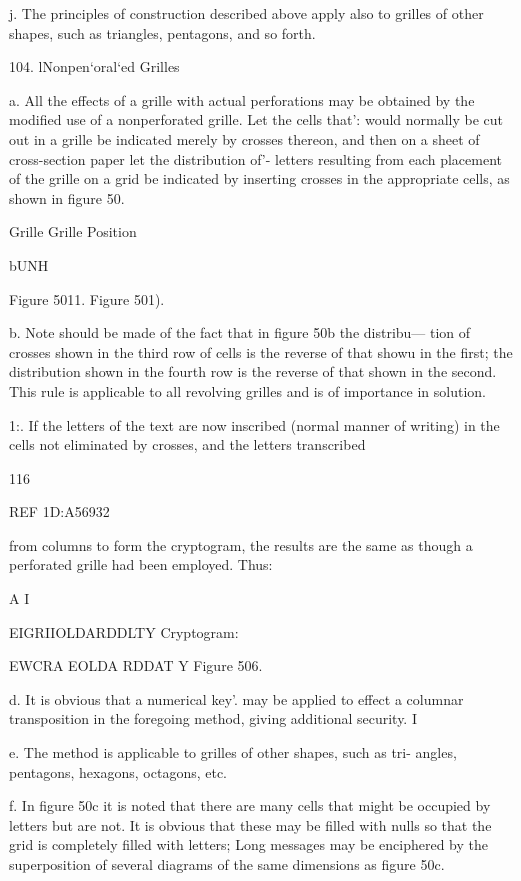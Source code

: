 j. The principles of construction described above apply also to grilles
of other shapes, such as triangles, pentagons, and so forth.

104. lNonpen‘oral‘ed Grilles

a. All the effects of a grille with actual perforations may be obtained
by the modiﬁed use of a nonperforated grille. Let the cells that': would
normally be cut out in a grille be indicated merely by crosses thereon,
and then on a sheet of cross-section paper let the distribution of'- letters
resulting from each placement of the grille on a grid be indicated by
inserting crosses in the appropriate cells, as shown in ﬁgure 50.

Grille Grille Position

   

bUNH

Figure 5011. Figure 501).

b. Note should be made of the fact that in ﬁgure 50b the distribu—
tion of crosses shown in the third row of cells is the reverse of that
showu in the ﬁrst; the distribution shown in the fourth row is the reverse
of that shown in the second. This rule is applicable to all revolving
grilles and is of importance in solution.

1:. If the letters of the text are now inscribed (normal manner of
writing) in the cells not eliminated by crosses, and the letters transcribed

116

REF 1D:A56932

from columns to form the cryptogram, the results are the same as though
a perforated grille had been employed. Thus:

 

A I

EIGRIIOLDARDDLTY
Cryptogram:

EWCRA EOLDA RDDAT Y
Figure 506.

d. It is obvious that a numerical key'. may be applied to effect a
columnar transposition in the foregoing method, giving additional
security. I

e. The method is applicable to grilles of other shapes, such as tri-
angles, pentagons, hexagons, octagons, etc.

f. In ﬁgure 50c it is noted that there are many cells that might be
occupied by letters but are not. It is obvious that these may be ﬁlled with
nulls so that the grid is completely ﬁlled with letters; Long messages may
be enciphered by the superposition of several diagrams of the same
dimensions as ﬁgure 50c.

